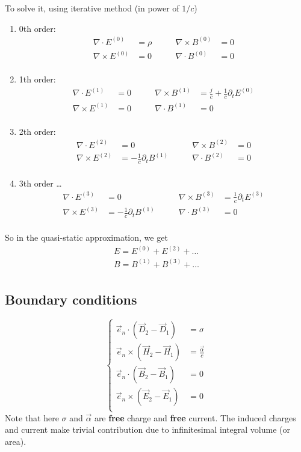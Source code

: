 To solve it, using iterative method (in power of $1/c$)
\begin{enumerate}[label=\roman*)]
\item 0th order:
\[
    \begin{aligned}
	\nabla\cdot{E^{(0)}} &= \rho	\qquad	&\nabla\times{B^{(0)}} &= 0 \\
	\nabla\times{E^{(0)}} &= 0	\qquad	&\nabla\cdot{B^{(0)}}  &= 0 \\
    \end{aligned}
\]
\item 1th order:
\[
    \begin{aligned}
	\nabla\cdot{E^{(1)}} &= 0	\qquad	&\nabla\times{B^{(1)}} &= \frac{j}{c} + \frac{1}{c}\partial_{t}E^{(0)}	\\
	\nabla\times{E^{(1)}} &= 0	\qquad	&\nabla\cdot{B^{(1)}}  &= 0 \\
    \end{aligned}
\]
\item 2th order:
\[
    \begin{aligned}
	\nabla\cdot{E^{(2)}} &= 0	\qquad	&\nabla\times{B^{(2)}} &= 0 \\
	\nabla\times{E^{(2)}} &= -\frac{1}{c}\partial_{t}B^{(1)}
	\qquad	&\nabla\cdot{B^{(2)}}  &= 0 \\
    \end{aligned}
\]
\item 3th order \dots
\[
    \begin{aligned}
	\nabla\cdot{E^{(3)}} &= 0	\qquad	&\nabla\times{B^{(3)}} &= \frac{1}{c}\partial_{t}E^{(3)} \\
	\nabla\times{E^{(3)}} &= -\frac{1}{c}\partial_{t}B^{(1)}
	\qquad	&\nabla\cdot{B^{(3)}}  &= 0 \\
    \end{aligned}
\]
\end{enumerate}
So in the quasi-static approximation, we get 
\[
    \begin{aligned}
    E = E^{(0)} + E^{(2)} + \dots   \\
    B = B^{(1)} + B^{(3)} + \dots   \\
    \end{aligned}
    \]

\subsection{Boundary conditions}
\begin{equation}
    \left\{
	\begin{aligned}
	    \vec{e}_n \cdot (\vec{D}_2 - \vec{D}_1) &= \sigma    \\
	    \vec{e}_n \times (\vec{H}_2 - \vec{H}_1) &= \frac{\vec{\alpha}}{c}    \\
	    \vec{e}_n \cdot (\vec{B}_2 - \vec{B}_1) &= 0	\\
	    \vec{e}_n \times (\vec{E}_2 - \vec{E}_1) &= 0    \\
	\end{aligned}
	\right.
\end{equation}
Note that here $\sigma$ and $\vec{\alpha}$ are \textbf{free} charge and
\textbf{free} current. The induced charges and current make trivial
contribution due to infinitesimal integral volume (or area).
